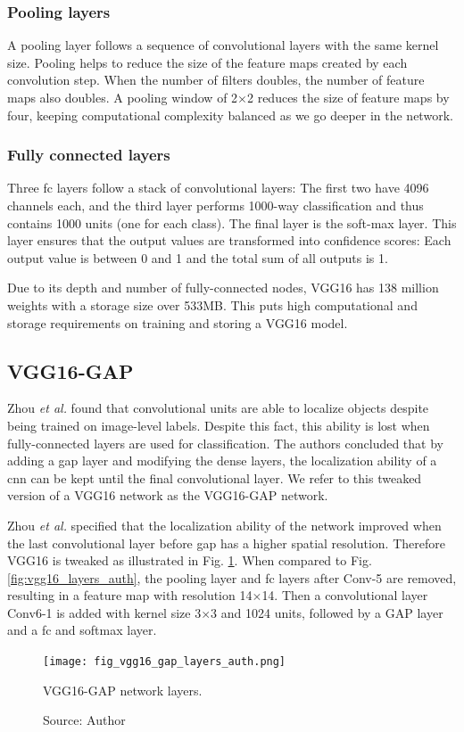 \subsubsection{Pooling layers}
A pooling layer follows a sequence of convolutional layers with the same kernel size. Pooling helps to reduce the size of the feature maps created by each convolution step. When the number of filters doubles, the number of feature maps also doubles. A pooling window of 2$\times$2 reduces the size of feature maps by four, keeping computational complexity balanced as we go deeper in the network.

\subsubsection{Fully connected layers}
Three \acrfull{fc} layers follow a stack of convolutional layers: The first two have 4096 channels each, and the third layer performs 1000-way classification and thus contains 1000 units (one for each class). The final layer is the soft-max layer. This layer ensures that the output values are transformed into confidence scores: Each output value is between 0 and 1 and the total sum of all outputs is 1.

Due to its depth and number of fully-connected nodes, VGG16 has 138 million weights with a storage size over 533MB. This puts high computational and storage requirements on training and storing a VGG16 model.

\subsection{VGG16-GAP}
Zhou \textit{et al.} \cite{zhou2016cvpr} found that convolutional units are able to localize objects despite being trained on image-level labels. Despite this fact, this ability is lost when fully-connected layers are used for classification. The authors concluded that by adding a \acrfull{gap} layer and modifying the dense layers, the localization ability of a \acrshort{cnn} can be kept until the final convolutional layer. We refer to this tweaked version of a VGG16 network as the VGG16-GAP network.

Zhou \textit{et al.} specified that the localization ability of the network improved when the last convolutional layer before \acrshort{gap} has a higher spatial resolution. Therefore VGG16 is tweaked as illustrated in Fig. \ref{fig:vgg16_gap_layers_auth}. When compared to Fig. \ref{fig:vgg16_layers_auth}, the pooling layer and \acrshort{fc} layers after Conv-5 are removed, resulting in a feature map with resolution 14$\times$14. Then a convolutional layer Conv6-1 is added with kernel size 3$\times$3 and 1024 units, followed by a GAP layer and a \acrshort{fc} and softmax layer.
\begin{figure}[ht]
    \begin{center}       
    \texttt{[image: fig\_vgg16\_gap\_layers\_auth.png]}
    \caption[VGG16-GAP network layers]{VGG16-GAP network layers.}
    \caption*{Source: Author}
    \label{fig:vgg16_gap_layers_auth}
    \end{center}
\end{figure}

